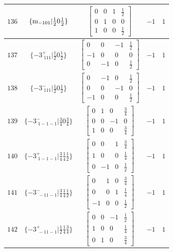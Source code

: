\documentclass[fleqn,8pt]{jsarticle}
\begin{document}
\begin{longtable}{ccccc}
$ 136 $ & $ \{{\rm m}_{-101}|\frac{1}{2} 0 \frac{1}{2}\} $ & $ \begin{bmatrix} 0 & 0 & 1 & \frac{1}{2} \\ 0 & 1 & 0 & 0 \\ 1 & 0 & 0 & \frac{1}{2} \end{bmatrix} $ & $ -1 $ & $ 1 $ \\ \hline
$ 137 $ & $ \{-3^{+}_{\,\,111}|\frac{1}{2} 0 \frac{1}{2}\} $ & $ \begin{bmatrix} 0 & 0 & -1 & \frac{1}{2} \\ -1 & 0 & 0 & 0 \\ 0 & -1 & 0 & \frac{1}{2} \end{bmatrix} $ & $ -1 $ & $ 1 $ \\ \hline
$ 138 $ & $ \{-3^{-}_{\,\,111}|\frac{1}{2} 0 \frac{1}{2}\} $ & $ \begin{bmatrix} 0 & -1 & 0 & \frac{1}{2} \\ 0 & 0 & -1 & 0 \\ -1 & 0 & 0 & \frac{1}{2} \end{bmatrix} $ & $ -1 $ & $ 1 $ \\ \hline
$ 139 $ & $ \{-3^{-}_{\,\,1-1-1}|\frac{3}{4} 0 \frac{3}{4}\} $ & $ \begin{bmatrix} 0 & 1 & 0 & \frac{3}{4} \\ 0 & 0 & -1 & 0 \\ 1 & 0 & 0 & \frac{3}{4} \end{bmatrix} $ & $ -1 $ & $ 1 $ \\ \hline
$ 140 $ & $ \{-3^{+}_{\,\,1-1-1}|\frac{3}{4} \frac{1}{4} \frac{1}{2}\} $ & $ \begin{bmatrix} 0 & 0 & 1 & \frac{3}{4} \\ 1 & 0 & 0 & \frac{1}{4} \\ 0 & -1 & 0 & \frac{1}{2} \end{bmatrix} $ & $ -1 $ & $ 1 $ \\ \hline
$ 141 $ & $ \{-3^{-}_{\,\,-11-1}|\frac{3}{4} \frac{1}{4} \frac{1}{2}\} $ & $ \begin{bmatrix} 0 & 1 & 0 & \frac{3}{4} \\ 0 & 0 & 1 & \frac{1}{4} \\ -1 & 0 & 0 & \frac{1}{2} \end{bmatrix} $ & $ -1 $ & $ 1 $ \\ \hline
$ 142 $ & $ \{-3^{+}_{\,\,-11-1}|\frac{1}{2} \frac{1}{4} \frac{3}{4}\} $ & $ \begin{bmatrix} 0 & 0 & -1 & \frac{1}{2} \\ 1 & 0 & 0 & \frac{1}{4} \\ 0 & 1 & 0 & \frac{3}{4} \end{bmatrix} $ & $ -1 $ & $ 1 $ \\ \hline

\end{longtable}
\end{document}
